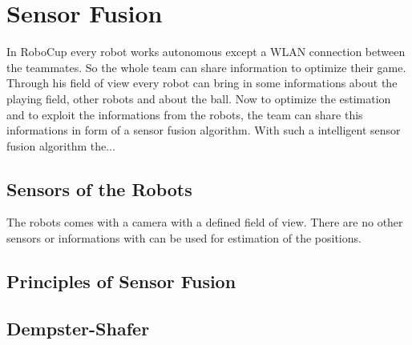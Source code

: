 
\chapter{Sensor Fusion}
In RoboCup every robot works autonomous except a WLAN connection between the teammates. So the whole team can share information to optimize their game.
Through his field of view every robot can bring in some informations about the playing field, other robots and about the ball. Now to optimize the estimation and to exploit the informations from the robots, the team can share this informations in form of a sensor fusion algorithm.
With such a intelligent sensor fusion algorithm the...

\section{Sensors of the Robots}
The robots comes with a camera with a defined field of view. There are no other sensors or informations with can be used for estimation of the positions.

\section{Principles of Sensor Fusion}

\section{Dempster-Shafer}


